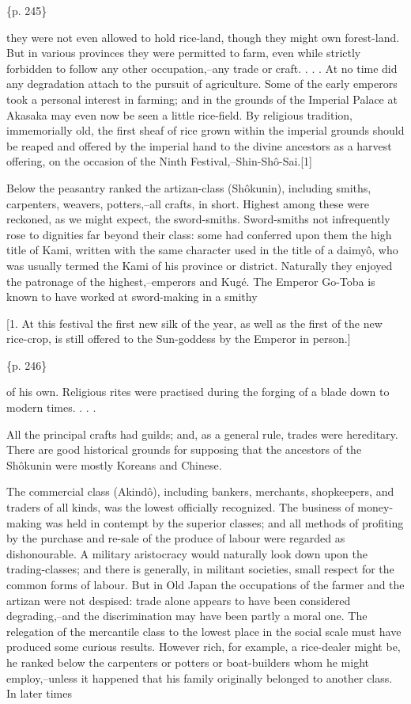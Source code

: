 \{p. 245\}

they were not even allowed to hold rice-land, though they might own forest-land. But in various provinces they were permitted to farm, even while strictly forbidden to follow any other occupation,--any trade or craft. . . . At no time did any degradation attach to the pursuit of agriculture. Some of the early emperors took a personal interest in farming; and in the grounds of the Imperial Palace at Akasaka may even now be seen a little rice-field. By religious tradition, immemorially old, the first sheaf of rice grown within the imperial grounds should be reaped and offered by the imperial hand to the divine ancestors as a harvest offering, on the occasion of the Ninth Festival,--Shin-Shô-Sai.[1]



Below the peasantry ranked the artizan-class (Shôkunin), including smiths, carpenters, weavers, potters,--all crafts, in short. Highest among these were reckoned, as we might expect, the sword-smiths. Sword-smiths not infrequently rose to dignities far beyond their class: some had conferred upon them the high title of Kami, written with the same character used in the title of a daimyô, who was usually termed the Kami of his province or district. Naturally they enjoyed the patronage of the highest,--emperors and Kugé. The Emperor Go-Toba is known to have worked at sword-making in a smithy

[1. At this festival the first new silk of the year, as well as the first of the new rice-crop, is still offered to the Sun-goddess by the Emperor in person.]

\{p. 246\}

of his own. Religious rites were practised during the forging of a blade down to modern times. . . .

All the principal crafts had guilds; and, as a general rule, trades were hereditary. There are good historical grounds for supposing that the ancestors of the Shôkunin were mostly Koreans and Chinese.

The commercial class (Akindô), including bankers, merchants, shopkeepers, and traders of all kinds, was the lowest officially recognized. The business of money-making was held in contempt by the superior classes; and all methods of profiting by the purchase and re-sale of the produce of labour were regarded as dishonourable. A military aristocracy would naturally look down upon the trading-classes; and there is generally, in militant societies, small respect for the common forms of labour. But in Old Japan the occupations of the farmer and the artizan were not despised: trade alone appears to have been considered degrading,--and the discrimination may have been partly a moral one. The relegation of the mercantile class to the lowest place in the social scale must have produced some curious results. However rich, for example, a rice-dealer might be, he ranked below the carpenters or potters or boat-builders whom he might employ,--unless it happened that his family originally belonged to another class. In later times

